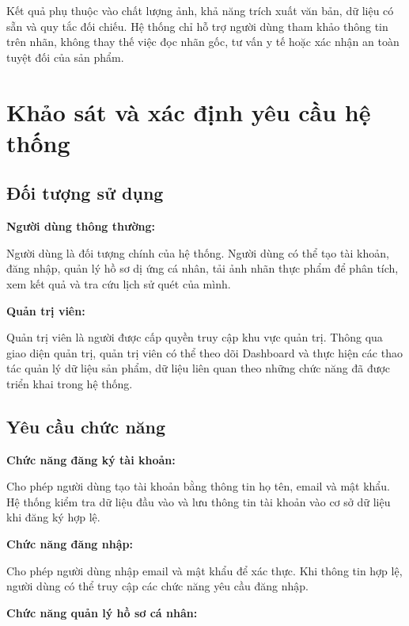 Kết quả phụ thuộc vào chất lượng ảnh, khả năng trích xuất văn bản, dữ liệu có sẵn và quy tắc đối chiếu. Hệ thống chỉ hỗ trợ người dùng tham khảo thông tin trên nhãn, không thay thế việc đọc nhãn gốc, tư vấn y tế hoặc xác nhận an toàn tuyệt đối của sản phẩm.


\section{Khảo sát và xác định yêu cầu hệ thống}

\subsection{Đối tượng sử dụng}

\textbf{Người dùng thông thường:}

Người dùng là đối tượng chính của hệ thống. Người dùng có thể tạo tài khoản, đăng nhập, quản lý hồ sơ dị ứng cá nhân, tải ảnh nhãn thực phẩm để phân tích, xem kết quả và tra cứu lịch sử quét của mình.

\textbf{Quản trị viên:}

Quản trị viên là người được cấp quyền truy cập khu vực quản trị. Thông qua giao diện quản trị, quản trị viên có thể theo dõi Dashboard và thực hiện các thao tác quản lý dữ liệu sản phẩm, dữ liệu liên quan theo những chức năng đã được triển khai trong hệ thống.

\subsection{Yêu cầu chức năng}

\textbf{Chức năng đăng ký tài khoản:}

Cho phép người dùng tạo tài khoản bằng thông tin họ tên, email và mật khẩu. Hệ thống kiểm tra dữ liệu đầu vào và lưu thông tin tài khoản vào cơ sở dữ liệu khi đăng ký hợp lệ.

\textbf{Chức năng đăng nhập:}

Cho phép người dùng nhập email và mật khẩu để xác thực. Khi thông tin hợp lệ, người dùng có thể truy cập các chức năng yêu cầu đăng nhập.

\textbf{Chức năng quản lý hồ sơ cá nhân:}

